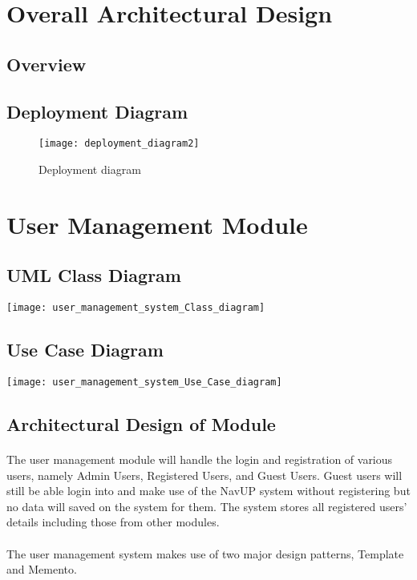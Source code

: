 \documentclass{article}
\begin{document}
\section{Overall Architectural Design}
\subsection{Overview}
\subsection{Deployment Diagram}

\pagebreak
\begin{figure}
\texttt{[image: deployment\_diagram2]}
\caption{Deployment diagram}
\end{figure}

\section{User Management Module}

\subsection{UML Class Diagram}
\texttt{[image: user\_management\_system\_Class\_diagram]}


\subsection{Use Case Diagram}

\texttt{[image: user\_management\_system\_Use\_Case\_diagram]}

\subsection{Architectural Design of Module}
\paragraph{}The user management module will handle the login and registration of various users, namely Admin Users, Registered Users, and Guest Users. Guest users will still be able login into and make use of the NavUP system without registering but no data will saved on the system for them. The system stores all registered users' details including those from other modules.

\paragraph{}The user management system makes use of two major design patterns, Template and Memento. 
\end{document}
